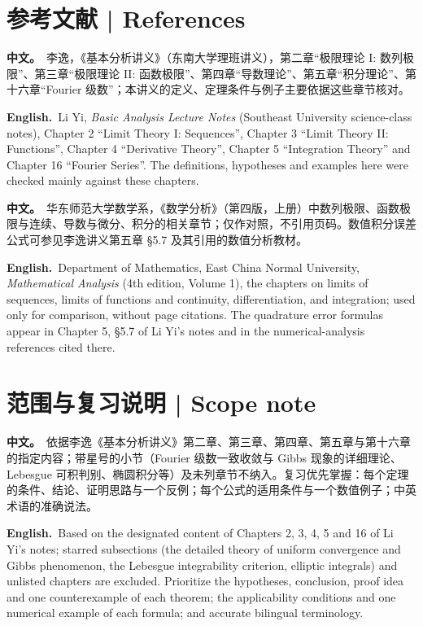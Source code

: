 \documentclass[UTF8,11pt,a4paper]{ctexart}
\newcommand{\BOTH}[2]{\par\noindent\textbf{中文。}\ #1\par\noindent\textbf{English.}\ #2\par}
\begin{document}
\section*{参考文献 | References}
\BOTH{李逸，《基本分析讲义》（东南大学理班讲义），第二章“极限理论 I: 数列极限”、第三章“极限理论 II: 函数极限”、第四章“导数理论”、第五章“积分理论”、第十六章“Fourier 级数”；本讲义的定义、定理条件与例子主要依据这些章节核对。}{Li Yi, \emph{Basic Analysis Lecture Notes} (Southeast University science-class notes), Chapter 2 “Limit Theory I: Sequences”, Chapter 3 “Limit Theory II: Functions”, Chapter 4 “Derivative Theory”, Chapter 5 “Integration Theory” and Chapter 16 “Fourier Series”. The definitions, hypotheses and examples here were checked mainly against these chapters.}
\BOTH{华东师范大学数学系，《数学分析》（第四版，上册）中数列极限、函数极限与连续、导数与微分、积分的相关章节；仅作对照，不引用页码。数值积分误差公式可参见李逸讲义第五章 §5.7 及其引用的数值分析教材。}{Department of Mathematics, East China Normal University, \emph{Mathematical Analysis} (4th edition, Volume 1), the chapters on limits of sequences, limits of functions and continuity, differentiation, and integration; used only for comparison, without page citations. The quadrature error formulas appear in Chapter 5, §5.7 of Li Yi's notes and in the numerical-analysis references cited there.}

\section*{范围与复习说明 | Scope note}
\BOTH{依据李逸《基本分析讲义》第二章、第三章、第四章、第五章与第十六章的指定内容；带星号的小节（Fourier 级数一致收敛与 Gibbs 现象的详细理论、Lebesgue 可积判别、椭圆积分等）及未列章节不纳入。复习优先掌握：每个定理的条件、结论、证明思路与一个反例；每个公式的适用条件与一个数值例子；中英术语的准确说法。}{Based on the designated content of Chapters 2, 3, 4, 5 and 16 of Li Yi's notes; starred subsections (the detailed theory of uniform convergence and Gibbs phenomenon, the Lebesgue integrability criterion, elliptic integrals) and unlisted chapters are excluded. Prioritize the hypotheses, conclusion, proof idea and one counterexample of each theorem; the applicability conditions and one numerical example of each formula; and accurate bilingual terminology.}
\end{document}
